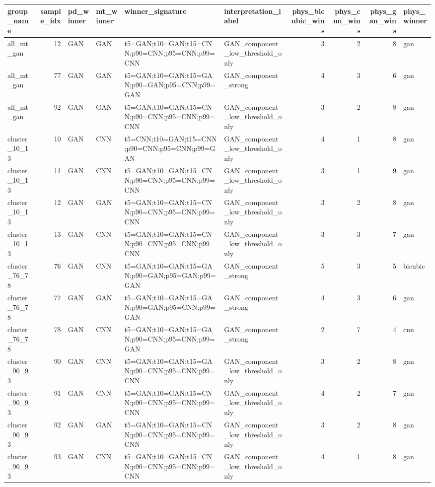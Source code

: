 \begin{tabular}{lrllllrrrl}
\toprule
group_name & sample_idx & pd_winner & mt_winner & winner_signature & interpretation_label & phys_bicubic_wins & phys_cnn_wins & phys_gan_wins & phys_winner \\
\midrule
all_mt_gan & 12 & GAN & GAN & t5=GAN;t10=GAN;t15=CNN;p90=CNN;p95=CNN;p99=CNN & GAN_component_low_threshold_only & 3 & 2 & 8 & gan \\
all_mt_gan & 77 & GAN & GAN & t5=GAN;t10=GAN;t15=GAN;p90=GAN;p95=CNN;p99=GAN & GAN_component_strong & 4 & 3 & 6 & gan \\
all_mt_gan & 92 & GAN & GAN & t5=GAN;t10=GAN;t15=CNN;p90=CNN;p95=CNN;p99=CNN & GAN_component_low_threshold_only & 3 & 2 & 8 & gan \\
cluster_10_13 & 10 & GAN & CNN & t5=CNN;t10=GAN;t15=CNN;p90=CNN;p95=CNN;p99=GAN & GAN_component_low_threshold_only & 4 & 1 & 8 & gan \\
cluster_10_13 & 11 & GAN & CNN & t5=GAN;t10=GAN;t15=CNN;p90=CNN;p95=CNN;p99=CNN & GAN_component_low_threshold_only & 3 & 1 & 9 & gan \\
cluster_10_13 & 12 & GAN & GAN & t5=GAN;t10=GAN;t15=CNN;p90=CNN;p95=CNN;p99=CNN & GAN_component_low_threshold_only & 3 & 2 & 8 & gan \\
cluster_10_13 & 13 & GAN & CNN & t5=GAN;t10=GAN;t15=CNN;p90=CNN;p95=CNN;p99=CNN & GAN_component_low_threshold_only & 3 & 3 & 7 & gan \\
cluster_76_78 & 76 & GAN & CNN & t5=GAN;t10=GAN;t15=GAN;p90=GAN;p95=GAN;p99=GAN & GAN_component_strong & 5 & 3 & 5 & bicubic \\
cluster_76_78 & 77 & GAN & GAN & t5=GAN;t10=GAN;t15=GAN;p90=GAN;p95=CNN;p99=GAN & GAN_component_strong & 4 & 3 & 6 & gan \\
cluster_76_78 & 78 & GAN & CNN & t5=GAN;t10=GAN;t15=GAN;p90=CNN;p95=CNN;p99=GAN & GAN_component_strong & 2 & 7 & 4 & cnn \\
cluster_90_93 & 90 & GAN & CNN & t5=GAN;t10=GAN;t15=GAN;p90=CNN;p95=CNN;p99=CNN & GAN_component_low_threshold_only & 3 & 2 & 8 & gan \\
cluster_90_93 & 91 & GAN & CNN & t5=GAN;t10=GAN;t15=CNN;p90=CNN;p95=CNN;p99=CNN & GAN_component_low_threshold_only & 4 & 2 & 7 & gan \\
cluster_90_93 & 92 & GAN & GAN & t5=GAN;t10=GAN;t15=CNN;p90=CNN;p95=CNN;p99=CNN & GAN_component_low_threshold_only & 3 & 2 & 8 & gan \\
cluster_90_93 & 93 & GAN & CNN & t5=GAN;t10=GAN;t15=CNN;p90=CNN;p95=CNN;p99=CNN & GAN_component_low_threshold_only & 4 & 1 & 8 & gan \\

\end{tabular}

